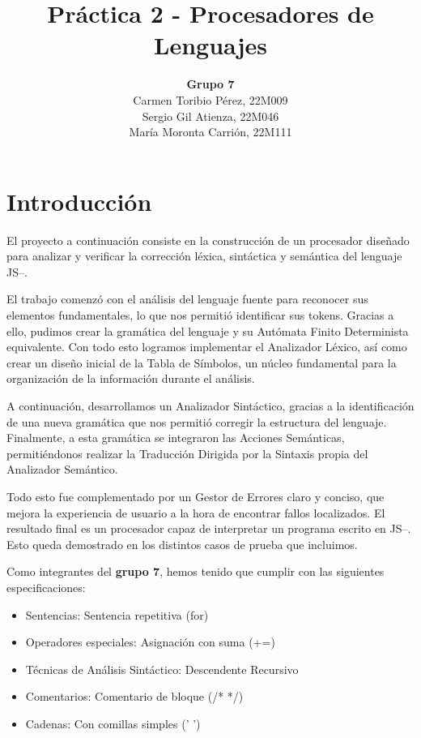 \documentclass{article}
\title{\textbf{Práctica 2 - Procesadores de Lenguajes}}
\author{\textbf{Grupo 7}\\Carmen Toribio Pérez, 22M009\\Sergio Gil Atienza, 22M046\\María Moronta Carrión, 22M111}
\date{}
\begin{document}
\maketitle

\tableofcontents

\section*{Introducción}

El proyecto a continuación consiste en la construcción de un procesador diseñado para analizar y verificar la corrección léxica, sintáctica y semántica del lenguaje JS--.

El trabajo comenzó con el análisis del lenguaje fuente para reconocer sus elementos fundamentales, lo que nos permitió identificar sus tokens. Gracias a ello, pudimos crear la gramática del lenguaje y su Autómata Finito Determinista equivalente. Con todo esto logramos implementar el Analizador Léxico, así como crear un diseño inicial de la Tabla de Símbolos, un núcleo fundamental para la organización de la información durante el análisis. 

A continuación, desarrollamos un Analizador Sintáctico, gracias a la identificación de una nueva gramática que nos permitió corregir la estructura del lenguaje. Finalmente, a esta gramática se integraron las Acciones Semánticas, permitiéndonos realizar la Traducción Dirigida por la Sintaxis propia del Analizador Semántico. 

Todo esto fue complementado por un Gestor de Errores claro y conciso, que mejora la experiencia de usuario a la hora de encontrar fallos localizados. El resultado final es un procesador capaz de interpretar un programa escrito en JS--. Esto queda demostrado en los distintos casos de prueba que incluimos. 

Como integrantes del \textbf{grupo 7}, hemos tenido que cumplir con las siguientes especificaciones: 
\begin{itemize}[left=2cm]
    \item Sentencias: Sentencia repetitiva (for)
    \item Operadores especiales: Asignación con suma (+=)
    \item Técnicas de Análisis Sintáctico: Descendente Recursivo
    \item Comentarios: Comentario de bloque (/* */)
    \item Cadenas: Con comillas simples (' ')
\end{itemize}
\end{document}
